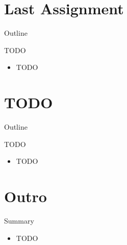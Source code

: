\section{Last Assignment}

\begin{frame}{Outline}
  \tableofcontents[current]
\end{frame}

\begin{frame}{TODO}
  \begin{itemize}
  \item TODO
  \end{itemize}
\end{frame}


\section{TODO}

\begin{frame}{Outline}
  \tableofcontents[current]
\end{frame}

\begin{frame}{TODO}
  \begin{itemize}
  \item TODO
  \end{itemize}
\end{frame}


\section*{Outro}

\begin{frame}{Summary}
  \begin{itemize}
  \item TODO
  \end{itemize}
\end{frame}


